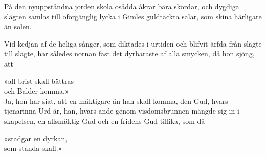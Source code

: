 På den nyuppståndna jorden skola osådda åkrar bära skördar, och dygdiga
slägten samlas till oförgänglig lycka i Gimles guldtäckta salar, som
skina härligare än solen.

Vid kedjan af de heliga sånger, som diktades i urtiden och blifvit ärfda
från slägte till slägte, har således nornan fäst det dyrbaraste af alla
smycken, då hon sjöng, att

{»all brist skall bättras}\\
{och Balder komma.»}\\

Ja, hon har siat, att en mäktigare än han skall komma, den Gud, hvars
tjenarinna Urd är, han, hvars ande genom visdomsbrunnen mängde sig in i
skapelsen, en allsmäktig Gud och en fridens Gud tillika, som då

{»stadgar en dyrkan,}\\
{som stånda skall.»}\\


\bye

